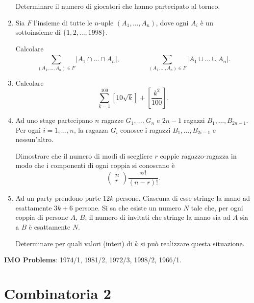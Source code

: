 \documentclass[a4paper,10pt]{article}
\begin{document}
\begin{enumerate}
	Determinare il numero di giocatori che hanno partecipato al torneo.

	\item  Sia $F$ l'insieme di tutte le $n$-uple $(A_{1},\ldots,A_{n})$,
	dove ogni $A_{i}$ \`{e} un sottoinsieme di $\{1,2,\ldots,1998\}$.

	Calcolare
	$$\sum_{(A_{1},\ldots,A_{n})\in F}^{}\left|
	A_{1}\cap\ldots\cap A_{n}\right|,
	\hspace{4em}
	\sum_{(A_{1},\ldots,A_{n})\in F}^{}\left|
	A_{1}\cup\ldots\cup A_{n}\right|.$$

	\item  Calcolare
	$$\sum_{k=1}^{100}\left[10\sqrt{k}\right]+
	\left[\frac{k^{2}}{100}\right].$$

	\item Ad uno stage partecipano $n$ ragazze $G_{1},\ldots,G_{n}$ e
	$2n-1$ ragazzi $B_{1},\ldots,B_{2n-1}$.  Per ogni $i=1,\ldots,n$,
	la ragazza $G_{i}$ conosce i ragazzi $B_{1},\ldots,B_{2i-1}$ e
	nessun'altro.

	Dimostrare che il numero di modi di scegliere $r$ coppie
	ragazzo-ragazza in modo che i componenti di ogni coppia si
	conoscano \`{e}
	$$\left(\!
	\begin{array}{c}
		n  \\
		r
	\end{array}\!
	\right)\frac{n!}{(n-r)!}.$$

	\item  Ad un party prendono parte $12k$ persone. Ciascuna di esse
	stringe la mano ad esattamente $3k+6$ persone. Si sa che esiste un
	numero $N$ tale che, per ogni coppia di persone $A$, $B$, il numero
	di invitati che stringe la mano sia ad $A$ sia a $B$ \`{e}
	esattamente $N$.

	Determinare per quali valori (interi) di $k$ si pu\`{o} realizzare
	questa situazione.

\end{enumerate}
\bigskip\bigskip

\textbf{IMO Problems}: 1974/1, 1981/2, 1972/3, 1998/2, 1966/1.


\section{Combinatoria 2}
\end{document}
